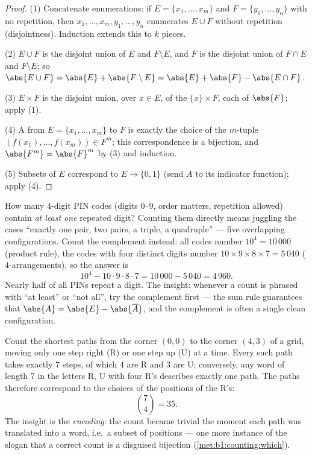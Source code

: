 \begin{proof}
(1) Concatenate enumerations: if $E = \{x_1, \dots, x_m\}$ and $F =
\{y_1, \dots, y_n\}$ with no repetition, then $x_1, \dots, x_m, y_1,
\dots, y_n$ enumerates $E \cup F$ without repetition (disjointness).
Induction extends this to $k$ pieces.

(2) $E \cup F$ is the disjoint union of $E$ and $F \setminus E$, and
$F$ is the disjoint union of $F \cap E$ and $F \setminus E$; so
$\abs{E \cup F} = \abs{E} + \abs{F \setminus E} = \abs{E} + \abs{F} -
\abs{E \cap F}$.

(3) $E \times F$ is the disjoint union, over $x \in E$, of the 
$\{x\} \times F$, each of  $\abs{F}$; apply (1).

(4) A  from $E = \{x_1, \dots, x_m\}$ to $F$ is exactly the choice
of the $m$-tuple $(f(x_1), \dots, f(x_m)) \in F^m$; this
correspondence is a bijection, and $\abs{F^m} = \abs{F}^m$ by (3) and
induction.

(5) Subsets of $E$ correspond  to  $E \to \{0, 1\}$
(send $A$ to its indicator function); apply (4).
\end{proof}

\begin{example}\label{ex:b1:counting:complement}
How many $4$-digit PIN codes (digits $0$--$9$, order matters,
repetition allowed) contain \emph{at least one} repeated digit?
Counting them directly means juggling the cases ``exactly one pair,
two pairs, a triple, a quadruple'' --- five overlapping
configurations. Count the complement instead: all codes number
$10^4 = 10\,000$ (product rule), the codes with four distinct
digits number $10 \times 9 \times 8 \times 7 = 5\,040$
($4$-arrangements), so the answer is
\[
10^4 - 10 \cdot 9 \cdot 8 \cdot 7 = 10\,000 - 5\,040 = 4\,960 .
\]
Nearly half of all PINs repeat a digit. The insight: whenever a
count is phrased with ``at least'' or ``not all'', try the
complement first --- the sum rule guarantees that
$\abs{A} = \abs{E} - \abs{\overline A}$, and the complement is
often a single clean configuration.
\end{example}

\begin{example}\label{ex:b1:counting:paths}
Count the shortest paths from the corner $(0,0)$ to the corner
$(4, 3)$ of a grid, moving only one step right (R) or one step up
(U) at a time. Every such path takes exactly $7$ steps, of which
$4$ are R and $3$ are U; conversely, any word of length $7$ in the
letters R, U with four R's describes exactly one path. The paths
therefore correspond  to the choices of the positions
of the R's:
\[
\binom{7}{4} = 35 .
\]
The insight is the \emph{encoding}: the count became trivial the
moment each path was translated into a word, i.e.\ a subset of
positions --- one more instance of the slogan that a correct count
is a disguised bijection (\cref{met:b1:counting:which}).
\end{example}

